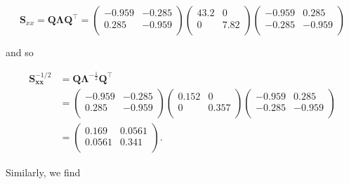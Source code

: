\documentclass[
]{book}
\newenvironment{Shaded}{\begin{snugshade}}{\end{snugshade}}
\newcommand{\DecValTok}[1]{\textcolor[rgb]{0.00,0.00,0.81}{#1}}
\newcommand{\FunctionTok}[1]{\textcolor[rgb]{0.13,0.29,0.53}{\textbf{#1}}}
\newcommand{\NormalTok}[1]{#1}
\newcommand{\OtherTok}[1]{\textcolor[rgb]{0.56,0.35,0.01}{#1}}
\newcommand{\SpecialCharTok}[1]{\textcolor[rgb]{0.81,0.36,0.00}{\textbf{#1}}}
\theoremstyle{definition}
\theoremstyle{definition}
\theoremstyle{definition}
\theoremstyle{definition}
\theoremstyle{remark}
\begin{document}
\[\mathbf S_{xx} =\mathbf Q\boldsymbol \Lambda\mathbf Q^\top=\begin{pmatrix}-0.959&-0.285 \\0.285&-0.959 \\\end{pmatrix} \begin{pmatrix}43.2&0 \\0&7.82 \\\end{pmatrix} \begin{pmatrix}-0.959&0.285 \\-0.285&-0.959 \\\end{pmatrix}\]

and so

\begin{align*}
\mathbf S_{\mathbf x\mathbf x}^{-1/2} &= \mathbf Q\boldsymbol \Lambda^{-\frac{1}{2}}\mathbf Q^\top \\
&=\begin{pmatrix}-0.959&-0.285 \\0.285&-0.959 \\\end{pmatrix} \begin{pmatrix}0.152&0 \\0&0.357 \\\end{pmatrix} \begin{pmatrix}-0.959&0.285 \\-0.285&-0.959 \\\end{pmatrix}\\
&= \begin{pmatrix}0.169&0.0561 \\0.0561&0.341 \\\end{pmatrix}.
\end{align*}

Similarly, we find

\begin{Shaded}
\end{Shaded}
\end{document}

